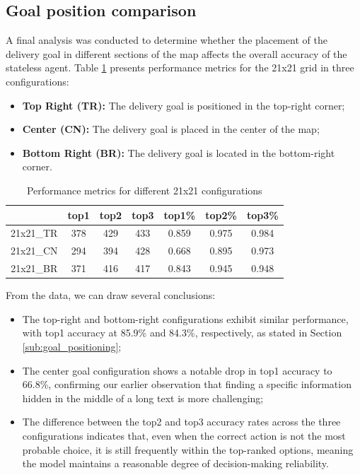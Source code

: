 \subsection{Goal position comparison}

A final analysis was conducted to determine whether the placement of the
delivery goal in different sections of the map affects the overall accuracy of
the stateless agent. Table \ref{tab:performance_21x21} presents performance metrics
for the 21x21 grid in three configurations:
\begin{itemize}
  \item \textbf{Top Right (TR):} The delivery goal is positioned in the top-right
    corner;

  \item \textbf{Center (CN):} The delivery goal is placed in the center of the
    map;

  \item \textbf{Bottom Right (BR):} The delivery goal is located in the bottom-right
    corner.
\end{itemize}

\begin{table}[h]
  \centering
  \begin{tabular}{c|ccc|ccc}
              & top1 & top2 & top3 & top1\% & top2\% & top3\% \\
    \hline
    21x21\_TR & 378  & 429  & 433  & 0.859  & 0.975  & 0.984  \\
    21x21\_CN & 294  & 394  & 428  & 0.668  & 0.895  & 0.973  \\
    21x21\_BR & 371  & 416  & 417  & 0.843  & 0.945  & 0.948  \\
  \end{tabular}
  \caption{Performance metrics for different 21x21 configurations}
  \label{tab:performance_21x21}
\end{table}

From the data, we can draw several conclusions:
\begin{itemize}
  \item The top-right and bottom-right configurations exhibit similar performance,
    with top1 accuracy at 85.9\% and 84.3\%, respectively, as stated in Section
    \ref{sub:goal_positioning};

  \item The center goal configuration shows a notable drop in top1 accuracy to 66.8\%,
    confirming our earlier observation that finding a specific information hidden
    in the middle of a long text is more challenging;

  \item The difference between the top2 and top3 accuracy rates across the three
    configurations indicates that, even when the correct action is not the most
    probable choice, it is still frequently within the top-ranked options,
    meaning the model maintains a reasonable degree of decision-making
    reliability.
\end{itemize}

